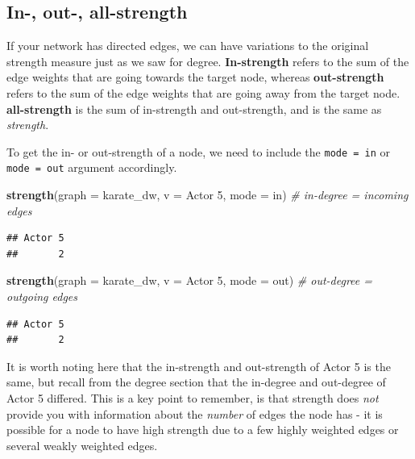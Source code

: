 \documentclass[
]{book}
\newenvironment{Shaded}{\begin{snugshade}}{\end{snugshade}}
\newcommand{\AttributeTok}[1]{\textcolor[rgb]{0.13,0.29,0.53}{#1}}
\newcommand{\CommentTok}[1]{\textcolor[rgb]{0.56,0.35,0.01}{\textit{#1}}}
\newcommand{\FunctionTok}[1]{\textcolor[rgb]{0.13,0.29,0.53}{\textbf{#1}}}
\newcommand{\NormalTok}[1]{#1}
\newcommand{\StringTok}[1]{\textcolor[rgb]{0.31,0.60,0.02}{#1}}
\begin{document}
\subsection{In-, out-, all-strength}\label{in--out--all-strength}

If your network has directed edges, we can have variations to the original strength measure just as we saw for degree. \textbf{In-strength} refers to the sum of the edge weights that are going towards the target node, whereas \textbf{out-strength} refers to the sum of the edge weights that are going away from the target node. \textbf{all-strength} is the sum of in-strength and out-strength, and is the same as \emph{strength}.

To get the in- or out-strength of a node, we need to include the \texttt{mode\ =\ \textquotesingle{}in\textquotesingle{}} or \texttt{mode\ =\ \textquotesingle{}out\textquotesingle{}} argument accordingly.

\begin{Shaded}
\begin{Highlighting}[]
\FunctionTok{strength}\NormalTok{(}\AttributeTok{graph =}\NormalTok{ karate\_dw, }\AttributeTok{v =} \StringTok{\textquotesingle{}Actor 5\textquotesingle{}}\NormalTok{, }\AttributeTok{mode =} \StringTok{\textquotesingle{}in\textquotesingle{}}\NormalTok{) }\CommentTok{\# in{-}degree = incoming edges}
\end{Highlighting}
\end{Shaded}

\begin{verbatim}
## Actor 5 
##       2
\end{verbatim}

\begin{Shaded}
\begin{Highlighting}[]
\FunctionTok{strength}\NormalTok{(}\AttributeTok{graph =}\NormalTok{ karate\_dw, }\AttributeTok{v =} \StringTok{\textquotesingle{}Actor 5\textquotesingle{}}\NormalTok{, }\AttributeTok{mode =} \StringTok{\textquotesingle{}out\textquotesingle{}}\NormalTok{) }\CommentTok{\# out{-}degree = outgoing edges}
\end{Highlighting}
\end{Shaded}

\begin{verbatim}
## Actor 5 
##       2
\end{verbatim}

It is worth noting here that the in-strength and out-strength of Actor 5 is the same, but recall from the degree section that the in-degree and out-degree of Actor 5 differed. This is a key point to remember, is that strength does \emph{not} provide you with information about the \emph{number} of edges the node has - it is possible for a node to have high strength due to a few highly weighted edges or several weakly weighted edges.
\end{document}
